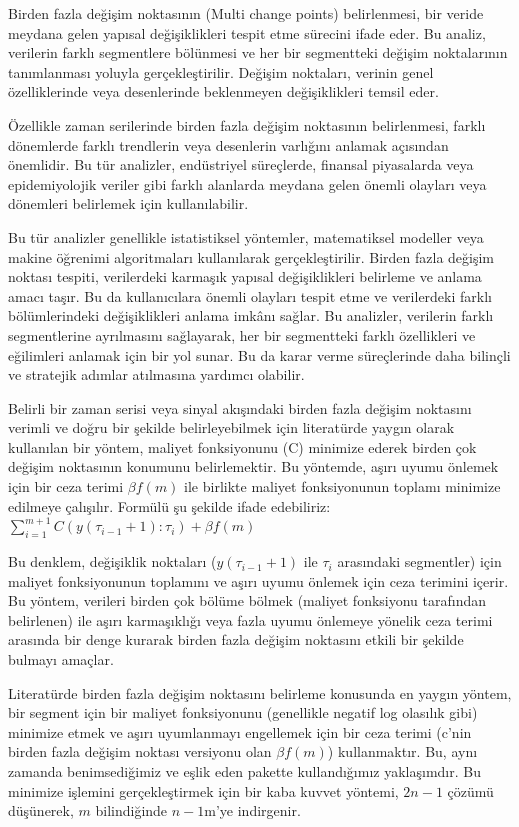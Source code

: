 \documentclass[12pt,twoside]{deuthesis}
\begin{document}
Birden fazla değişim noktasının (Multi change points) belirlenmesi, bir veride meydana gelen yapısal değişiklikleri tespit etme sürecini ifade eder. Bu analiz, verilerin farklı segmentlere bölünmesi ve her bir segmentteki değişim noktalarının tanımlanması yoluyla gerçekleştirilir. Değişim noktaları, verinin genel özelliklerinde veya desenlerinde beklenmeyen değişiklikleri temsil eder.

Özellikle zaman serilerinde birden fazla değişim noktasının belirlenmesi, farklı dönemlerde farklı trendlerin veya desenlerin varlığını anlamak açısından önemlidir. Bu tür analizler, endüstriyel süreçlerde, finansal piyasalarda veya epidemiyolojik veriler gibi farklı alanlarda meydana gelen önemli olayları veya dönemleri belirlemek için kullanılabilir.

Bu tür analizler genellikle istatistiksel yöntemler, matematiksel modeller veya makine öğrenimi algoritmaları kullanılarak gerçekleştirilir. Birden fazla değişim noktası tespiti, verilerdeki karmaşık yapısal değişiklikleri belirleme ve anlama amacı taşır. Bu da kullanıcılara önemli olayları tespit etme ve verilerdeki farklı bölümlerindeki değişiklikleri anlama imkânı sağlar. Bu analizler, verilerin farklı segmentlerine ayrılmasını sağlayarak, her bir segmentteki farklı özellikleri ve eğilimleri anlamak için bir yol sunar. Bu da karar verme süreçlerinde daha bilinçli ve stratejik adımlar atılmasına yardımcı olabilir.

Belirli bir zaman serisi veya sinyal akışındaki birden fazla değişim noktasını verimli ve doğru bir şekilde belirleyebilmek için literatürde yaygın olarak kullanılan bir yöntem, maliyet fonksiyonunu (C) minimize ederek birden çok değişim noktasının konumunu belirlemektir. Bu yöntemde, aşırı uyumu önlemek için bir ceza terimi \(\beta f(m)\) ile birlikte maliyet fonksiyonunun toplamı minimize edilmeye çalışılır. Formülü şu şekilde ifade edebiliriz: \(\sum_{i=1}^{m+1} C(y(\tau_{i-1}+1):\tau_i) + \beta f(m)\)

Bu denklem, değişiklik noktaları (\(y(\tau_{i-1}+1)\) ile \(\tau_i\) arasındaki segmentler) için maliyet fonksiyonunun toplamını ve aşırı uyumu önlemek için ceza terimini içerir. Bu yöntem, verileri birden çok bölüme bölmek (maliyet fonksiyonu tarafından belirlenen) ile aşırı karmaşıklığı veya fazla uyumu önlemeye yönelik ceza terimi arasında bir denge kurarak birden fazla değişim noktasını etkili bir şekilde bulmayı amaçlar.

Literatürde birden fazla değişim noktasını belirleme konusunda en yaygın yöntem, bir segment için bir maliyet fonksiyonunu (genellikle negatif log olasılık gibi) minimize etmek ve aşırı uyumlanmayı engellemek için bir ceza terimi (c'nin birden fazla değişim noktası versiyonu olan \(\beta f(m)\)) kullanmaktır. Bu, aynı zamanda benimsediğimiz ve eşlik eden pakette kullandığımız yaklaşımdır. Bu minimize işlemini gerçekleştirmek için bir kaba kuvvet yöntemi, \(2n-1\) çözümü düşünerek, \(m\) bilindiğinde \(n-1\)m'ye indirgenir.
\end{document}
